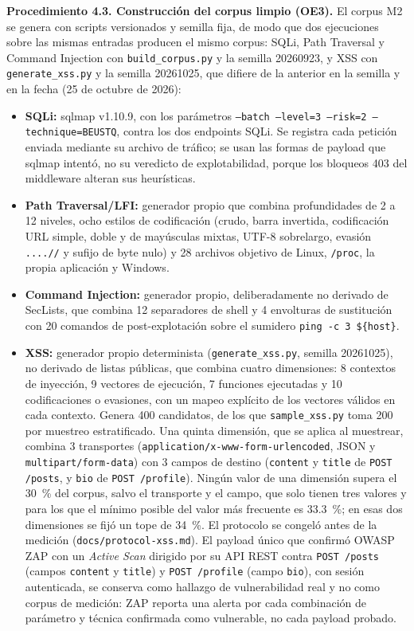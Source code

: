 \textbf{Procedimiento 4.3. Construcción del corpus limpio (OE3).} El corpus M2 se genera con
scripts versionados y semilla fija, de modo que dos ejecuciones sobre las mismas entradas
producen el mismo corpus: SQLi, Path Traversal y Command Injection con
\texttt{build\_corpus.py} y la semilla 20260923, y XSS con \texttt{generate\_xss.py} y la semilla
20261025, que difiere de la anterior en la semilla y en la fecha (25 de octubre de 2026):

\begin{itemize}
    \item \textbf{SQLi:} sqlmap \cite{sqlmap} v1.10.9, con los parámetros \texttt{--batch
    --level=3 --risk=2 --technique=BEUSTQ}, contra los dos endpoints SQLi. Se registra cada
    petición enviada mediante su archivo de tráfico; se usan las formas de payload que sqlmap
    intentó, no su veredicto de explotabilidad, porque los bloqueos 403 del middleware alteran
    sus heurísticas.
    \item \textbf{Path Traversal/LFI:} generador propio que combina profundidades de 2 a 12
    niveles, ocho estilos de codificación (crudo, barra invertida, codificación URL simple, doble
    y de mayúsculas mixtas, UTF-8 sobrelargo, evasión \texttt{....//} y sufijo de byte nulo) y 28
    archivos objetivo de Linux, \texttt{/proc}, la propia aplicación y Windows.
    \item \textbf{Command Injection:} generador propio, deliberadamente no derivado de SecLists,
    que combina 12 separadores de shell y 4 envolturas de sustitución con 20 comandos de
    post-explotación sobre el sumidero \texttt{ping -c 3 \$\{host\}}.
        \item \textbf{XSS:} generador propio determinista (\texttt{generate\_xss.py}, semilla 20261025),
    no derivado de listas públicas, que combina cuatro dimensiones: 8 contextos de inyección, 9
    vectores de ejecución, 7 funciones ejecutadas y 10 codificaciones o evasiones, con un mapeo
    explícito de los vectores válidos en cada contexto. Genera 400 candidatos, de los que
    \texttt{sample\_xss.py} toma 200 por muestreo estratificado. Una quinta dimensión, que se aplica
    al muestrear, combina 3 transportes (\texttt{application/x-www-form-urlencoded}, JSON y
    \texttt{multipart/form-data}) con 3 campos de destino (\texttt{content} y \texttt{title} de
    \texttt{POST /posts}, y \texttt{bio} de \texttt{POST /profile}). Ningún valor de una dimensión
    supera el 30~\% del corpus, salvo el transporte y el campo, que solo tienen tres valores y para
    los que el mínimo posible del valor más frecuente es 33.3~\%; en esas dos dimensiones se fijó un
    tope de 34~\%. El protocolo se congeló antes de la medición (\texttt{docs/protocol-xss.md}). El
    payload único que confirmó OWASP ZAP \cite{owaspzap} con un \textit{Active Scan} dirigido por su
    API REST contra \texttt{POST /posts} (campos \texttt{content} y \texttt{title}) y
    \texttt{POST /profile} (campo \texttt{bio}), con sesión autenticada, se conserva como hallazgo de
    vulnerabilidad real y no como corpus de medición: ZAP reporta una alerta por cada combinación de
    parámetro y técnica confirmada como vulnerable, no cada payload probado.
\end{itemize}

